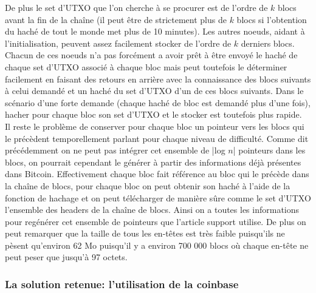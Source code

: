 \documentclass[12pt,a4paper]{article}
\begin{document}
De plus le set d'UTXO que l'on cherche à se procurer est de l'ordre de $k$ blocs avant la fin de la chaîne (il peut être de strictement plus de $k$ blocs si l'obtention du haché de tout le monde met plus de 10 minutes). Les autres noeuds, aidant à l'initialisation, peuvent assez facilement stocker de l'ordre de $k$ derniers blocs. Chacun de ces noeuds n'a pas forcément a avoir prêt à être envoyé le haché de chaque set d'UTXO associé à chaque bloc mais peut toutefois le déterminer facilement en faisant des retours en arrière avec la connaissance des blocs suivants à celui demandé et un haché du set d'UTXO d'un de ces blocs suivants. Dans le scénario d'une forte demande (chaque haché de bloc est demandé plus d'une fois), hacher pour chaque bloc son set d'UTXO et le stocker est toutefois plus rapide.\\ %

Il reste le problème de conserver pour chaque bloc un pointeur vers les blocs qui le précèdent temporellement parlant pour chaque niveau de difficulté. Comme dit précédemment on ne peut pas intégrer cet ensemble de |log $n$| pointeurs dans les blocs, on pourrait cependant le générer à partir des informations déjà présentes dans Bitcoin. Effectivement chaque bloc fait référence au bloc qui le précède dans la chaîne de blocs, pour chaque bloc on peut obtenir son haché à l'aide de la fonction de hachage et on peut télécharger de manière sûre comme le set d'UTXO l'ensemble des headers de la chaîne de blocs. Ainsi on a toutes les informations pour regénérer cet ensemble de pointeurs que l'article support utilise. De plus on peut remarquer que la taille de tous les en-têtes est très faible puisqu'ils ne pèsent qu'environ 62 Mo puisqu'il y a environ 700 000 blocs où chaque en-tête ne peut peser que jusqu'à 97 octets.\\ %

	\subsubsection{La solution retenue: l'utilisation de la coinbase} %
\end{document}

